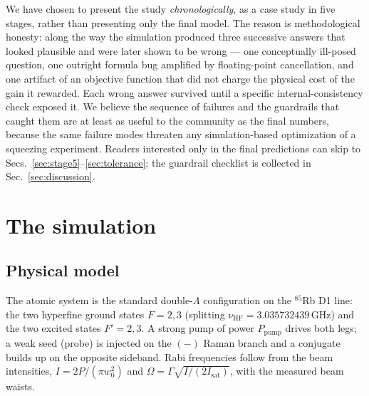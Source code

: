 \documentclass[11pt,a4paper]{article}
\newcommand{\GHz}{\,\mathrm{GHz}}
\newcommand{\Rb}{$^{85}$Rb}
\begin{document}
We have chosen to present the study \emph{chronologically}, as a case study
in five stages, rather than presenting only the final model. The reason is
methodological honesty: along the way the simulation produced three
successive answers that looked plausible and were later shown to be wrong ---
one conceptually ill-posed question, one outright formula bug amplified by
floating-point cancellation, and one artifact of an objective function that
did not charge the physical cost of the gain it rewarded. Each wrong answer
survived until a specific internal-consistency check exposed it. We believe
the sequence of failures and the guardrails that caught them are at least as
useful to the community as the final numbers, because the same failure modes
threaten any simulation-based optimization of a squeezing experiment. Readers
interested only in the final predictions can skip to
Secs.~\ref{sec:stage5}--\ref{sec:tolerance}; the guardrail checklist is
collected in Sec.~\ref{sec:discussion}.

\section{The simulation}
\label{sec:model}

\subsection{Physical model}
The atomic system is the standard double-$\Lambda$ configuration on the \Rb{}
D1 line: the two hyperfine ground states $F=2,3$ (splitting
$\nu_{\mathrm{HF}}=3.035732439\GHz$) and the two excited states $F'=2,3$. A
strong pump of power $P_{\mathrm{pump}}$ drives both legs; a weak seed
(probe) is injected on the $(-)$ Raman branch and a conjugate builds up on
the opposite sideband. Rabi frequencies follow from the beam intensities,
$I=2P/(\pi w_0^2)$ and $\Omega=\Gamma\sqrt{I/(2I_{\mathrm{sat}})}$, with the
measured beam waists.
\end{document}
